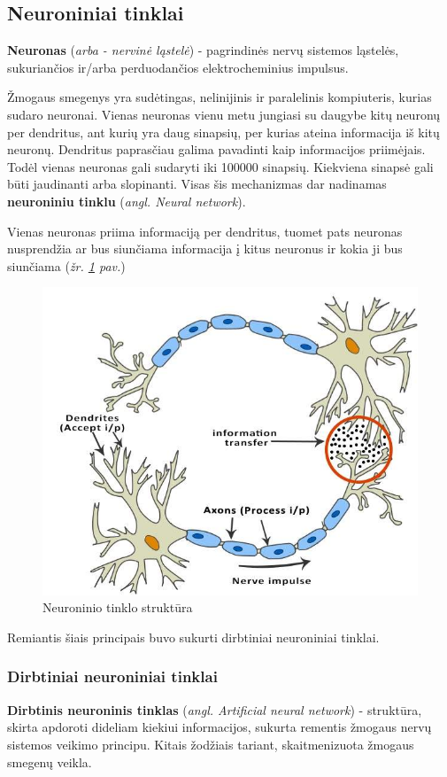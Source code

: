 \documentclass{VUMIFInfKursinis}
\begin{document}
\subsection{Neuroniniai tinklai}
\textbf{Neuronas} (\textit{arba - nervinė ląstelė}) - pagrindinės nervų sistemos ląstelės, sukuriančios ir/arba perduodančios elektrocheminius impulsus.



Žmogaus smegenys yra sudėtingas, nelinijinis ir paralelinis kompiuteris\cite{Hay09}, kurias sudaro neuronai. Vienas neuronas vienu metu jungiasi su daugybe kitų neuronų per dendritus, ant kurių yra daug sinapsių, per kurias ateina informacija iš kitų neuronų. Dendritus paprasčiau galima pavadinti kaip informacijos priimėjais. Todėl vienas neuronas gali sudaryti iki 100000 sinapsių. Kiekviena sinapsė gali būti jaudinanti arba slopinanti. Visas šis mechanizmas dar nadinamas \textbf{neuroniniu tinklu} (\textit{angl. Neural network}).

Vienas neuronas priima informaciją per dendritus, tuomet pats neuronas nusprendžia ar bus siunčiama informacija į kitus neuronus ir kokia ji bus siunčiama (\textit{žr. \ref{img:neuron_structure} pav.})

\begin{figure}[H]
	\centering
	\includegraphics[width=.5\linewidth]{img/neuron-structure}
	\caption[]{Neuroninio tinklo struktūra\footnotemark}
	\label{img:neuron_structure}
\end{figure}

Remiantis šiais principais buvo sukurti dirbtiniai neuroniniai tinklai.


\subsubsection{Dirbtiniai neuroniniai tinklai}
\textbf{Dirbtinis neuroninis tinklas} (\textit{angl. Artificial neural network}) - struktūra, skirta apdoroti dideliam kiekiui informacijos, sukurta rementis žmogaus nervų sistemos veikimo principu. Kitais žodžiais tariant, skaitmenizuota žmogaus smegenų veikla.
\end{document}
